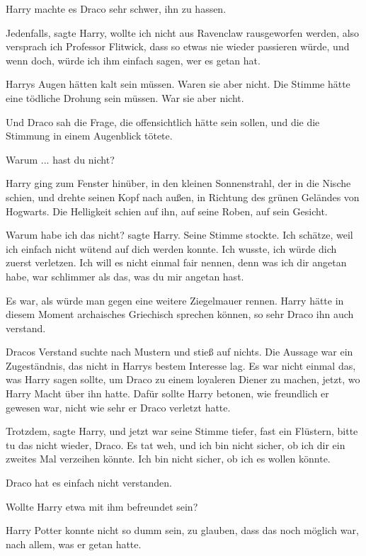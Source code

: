 Harry machte es Draco sehr schwer, ihn zu hassen.

\glqq{}Jedenfalls\grqq{}, sagte Harry, \glqq{}wollte ich nicht aus Ravenclaw
rausgeworfen werden, also versprach ich Professor Flitwick, dass so etwas nie
wieder passieren würde, und wenn doch, würde ich ihm einfach sagen, wer es getan
hat.\grqq{}

Harrys Augen hätten kalt sein müssen. Waren sie aber nicht. Die Stimme hätte
eine tödliche Drohung sein müssen. War sie aber nicht.

Und Draco sah die Frage, die offensichtlich hätte sein sollen, und die die
Stimmung in einem Augenblick tötete.

\glqq{}Warum ... hast du nicht?\grqq{}

Harry ging zum Fenster hinüber, in den kleinen Sonnenstrahl, der in die Nische
schien, und drehte seinen Kopf nach außen, in Richtung des grünen Geländes von
Hogwarts. Die Helligkeit schien auf ihn, auf seine Roben, auf sein Gesicht.

\glqq{}Warum habe ich das nicht?\grqq{} sagte Harry. Seine Stimme stockte. \glqq{}
Ich schätze, weil ich einfach nicht wütend auf dich werden konnte. Ich wusste,
ich würde dich zuerst verletzen. Ich will es nicht einmal fair nennen, denn was
ich dir angetan habe, war schlimmer als das, was du mir angetan hast.\grqq{}

Es war, als würde man gegen eine weitere Ziegelmauer rennen. Harry hätte in
diesem Moment archaisches Griechisch sprechen können, so sehr Draco ihn auch
verstand.

Dracos Verstand suchte nach Mustern und stieß auf nichts. Die Aussage war ein
Zugeständnis, das nicht in Harrys bestem Interesse lag. Es war nicht einmal das,
was Harry sagen sollte, um Draco zu einem loyaleren Diener zu machen, jetzt, wo
Harry Macht über ihn hatte. Dafür sollte Harry betonen, wie freundlich er
gewesen war, nicht wie sehr er Draco verletzt hatte.

\glqq{}Trotzdem\grqq{}, sagte Harry, und jetzt war seine Stimme tiefer, fast ein
Flüstern, \glqq{}bitte tu das nicht wieder, Draco. Es tat weh, und ich bin nicht
sicher, ob ich dir ein zweites Mal verzeihen könnte. Ich bin nicht sicher, ob
ich es wollen könnte.\grqq{}

Draco hat es einfach nicht verstanden.

Wollte Harry etwa mit ihm befreundet sein?

Harry Potter konnte nicht so dumm sein, zu glauben, dass das noch möglich war,
nach allem, was er getan hatte.

